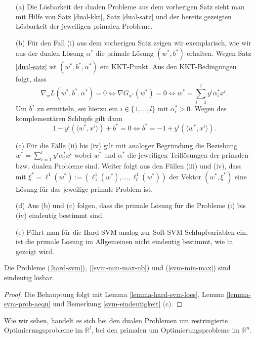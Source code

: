 \begin{bemerkung}\label{bem:duale-probleme}
\begin{itemize}
\item[(a)] Die Lösbarkeit der dualen Probleme aus dem vorherigen Satz sieht man mit Hilfe von Satz \ref{dual-kkt}, Satz \ref{dual-satz} und der bereits gezeigten Lösbarkeit der jeweiligen primalen Probleme.
\item[(b)]
Für den Fall (i) aus dem vorherigen Satz zeigen wir exemplarisch, wie wir aus der dualen Lösung $\alpha^*$ die primale Lösung $(w^*,b^*)$ erhalten. Wegen  Satz \ref{dual-satz} ist $(w^*,b^*,\alpha^*)$ ein KKT-Punkt. Aus den KKT-Bedingungen folgt, dass 
$$
\nabla_w L(w^*,b^*,\alpha^*) = 0 \Leftrightarrow \nabla G_{\alpha^*}(w^*) = 0 \Leftrightarrow w^* = \sum_{i=1}^{l}y^i \alpha_i^* x^i.
$$ 
Um $b^*$ zu ermitteln, sei hierzu ein $i \in \{1, ..., l\}$ mit $\alpha_i^* > 0$. Wegen des komplementären Schlupfs gilt dann 
$$
1-y^i(\langle w^*, x^i \rangle) + b^* = 0 \Leftrightarrow b^* = -1+y^i(\langle w^*, x^i \rangle).
$$
\item[(c)]
\label{svm-eindeutigkeit}
Für die Fälle (ii) bis (iv) gilt mit analoger Begründung die Beziehung 
$w^* = \sum_{i=1}^{l}y^i \alpha_i^* x^i$ wobei $w^*$ und $\alpha^*$ die jeweiligen Teillösungen der primalen bzw. dualen Probleme sind. 
Weiter folgt aus den Fällen (iii) und (iv), dass mit $\xi^* = \ell^1(w^*):=(\ell_1^1(w^*),...,\ell_l^1(w^*))$ der Vektor $(w^*,\xi^*)$ eine Lösung für das jeweilige primale Problem ist.

\item [(d)] Aus (b) und (c) folgen, dass die primale Lösung für die Probleme (i) bis (iv) eindeutig bestimmt sind.

\item[(e)] Führt man für die Hard-SVM analog zur Soft-SVM Schlupfvariablen ein, ist die primale Lösung im Allgemeinen nicht eindeutig bestimmt, wie in \cite{bcc-unqu-2000} gezeigt wird.
\end{itemize}
\end{bemerkung}

\begin{korollar}
	\label{korollar-prim-uniqu}
	Die Probleme (\ref{hard-svm}), (\ref{svm-min-max-nb}) und (\ref{svm-min-max}) sind eindeutig lösbar.
\end{korollar}
\begin{proof}
	Die Behauptung folgt mit Lemma \ref{lemma-hard-svm-loes}, Lemma \ref{lemma-svm-prob-aequ} und Bemerkung \ref{svm-eindeutigkeit} (c).
\end{proof}

Wie wir sehen, handelt es sich bei den dualen Problemen um restringierte Optimierungsprobleme im $\mathbb{R}^l$, bei den primalen um Optimierungsprobleme im $\mathbb{R}^n$.
